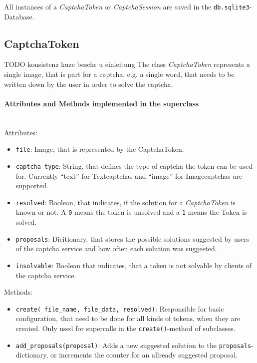 All instances of a \emph{CaptchaToken} or \emph{CaptchaSession} are saved in the \verb|db.sqlite3|-Database. 

\subsection{CaptchaToken}
TODO konsistenz kuze beschr u einleitung
The class \emph{CaptchaToken} represents a single image, that is part for a captcha, e.g. a single word, that needs to be written down by the user in order to solve the captcha.

\paragraph{Attributes and Methods implemented in the superclass} \mbox{} \\

Attributes:

\begin{itemize}
\item \verb|file|: Image, that is represented by the CaptchaToken.
\item \verb|captcha_type|: String, that defines the type of captcha the token can be used for. Currently ``text'' for Textcaptchas and ``image'' for Imagecaptchas are supported.
\item \verb|resolved|: Boolean, that indicates, if the solution for a \emph{CaptchaToken} is known or not. A \verb|0| means the token is unsolved and a \verb|1| means the Token is solved.
\item \verb|proposals|: Dicitionary, that stores the possible solutions suggested by users of the captcha service and how often each solution was suggested.
\item \verb|insolvable|: Boolean that indicates, that a token is not solvable by clients of the captcha service.
\end{itemize}

Methods:

\begin{itemize}
\item \verb|create( file_name, file_data, resolved)|: Responsible for basic configuration, that need to be done for all kinds of tokens, when they are created. Only used for supercalls in the \verb|create()|-method of subclasses.
\item \verb|add_proposals(proposal)|: Adds a new suggested solution to the \verb|proposals|-dictionary, or increments the counter for an allready suggested proposal.
\end{itemize}

